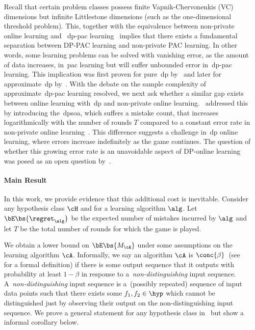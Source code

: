 Recall that certain problem classes possess finite Vapnik-Chervonenkis (VC) dimensions but infinite Littlestone dimensions (such as the one-dimensional threshold problem). 
This, together with the equivalence between non-private online learning and ~\Gls{dp}-\Gls{pac} learning~\citep{alon2022private} implies that there exists a fundamental separation between DP-PAC learning and non-private PAC learning. In other words, some learning problems can be solved with vanishing error, as the amount of data increases, in~\Gls{pac} learning but will suffer unbounded error in~\Gls{dp}-\Gls{pac} learning. This implication was first proven for pure~\Gls{dp} by~\citet{feldman2014sample} and later for approximate~\Gls{dp} by~\citet{alon2019private}. With the debate on the sample complexity of approximate~\Gls{dp}-\Gls{pac} learning resolved, we next ask whether a similar gap exists between online learning with~\Gls{dp} and non-private online learning.~\citet{golowich2021littlestone} addressed this by introducing the~\Gls{dpsoa}, which suffers a mistake count, that increases logarithmically with the number of rounds \(T\) compared to a constant error rate in non-private online learning~\citep{littlestone1988learning}. This difference suggests a challenge in~\Gls{dp} online learning, where errors increase indefinitely as the game continues. The question of whether this growing error rate is an unavoidable aspect of DP-online learning was posed as an open question by~\citet{dpopsanyal22a}.

\paragraph{Main Result} In this work, we provide evidence that this additional cost is inevitable. Consider any hypothesis class \(\cH\) and for a learning algorithm \(\alg\). Let \(\bE\bs{\regret_{\alg}}\) be the expected number of mistakes incurred by \(\alg\) and let \(T\) be the total number of rounds for which the game is played. 


We obtain a lower bound on \(\bE\bs{M_{\cA}}\) under some assumptions on the learning algorithm \(\cA\). Informally, we say an algorithm \(\cA\) is \(\conc{\beta}\)~(see~ for a formal definition) if there is some output sequence that it outputs with probability at least \(1-\beta\) in response to a~\emph{non-distinguishing} input sequence. A~\emph{non-distinguishing} input sequence is a~(possibly repeated) sequence of input data points such that there exists some \(f_1,f_2\in\hyp\) which cannot be distinguished just by observing their output on the non-distinguishing input sequence. We prove a general statement for any hypothesis class in~ but show a informal corollary below.

